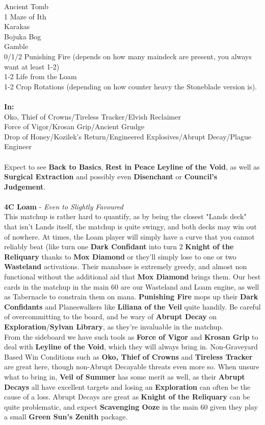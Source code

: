 \documentclass{report}
\begin{document}
Ancient Tomb\\1 Maze of Ith\\Karakas\\Bojuka Bog\\Gamble\\ 0/1/2 Punishing Fire (depends on how many maindeck are present, you always want at least 1-2)\\1-2 Life from the Loam\\1-2 Crop Rotations (depending on how counter heavy the Stoneblade version is).\\\\
\textbf{In:}\\Oko, Thief of Crowns/Tireless Tracker/Elvish Reclaimer\\Force of Vigor/Krosan Grip/Ancient Grudge\\
Drop of Honey/Kozilek's Return/Engineered Explosives/Abrupt Decay/Plague Engineer\\\\
Expect to see \textbf{Back to Basics}, \textbf{Rest in Peace} \textbf{Leyline of the Void}, as well as \textbf{Surgical Extraction} and possibly even \textbf{Disenchant} or \textbf{Council's Judgement}.\\\\
\textbf{4C Loam} - \emph{Even to Slightly Favoured}\\
This matchup is rather hard to quantify, as by being the closest "Lands deck" that isn't Lands itself, the matchup is quite swingy, and both decks may win out of nowhere. At times, the Loam player will simply have a curve that you cannot reliably beat (like turn one \textbf{Dark Confidant} into turn 2 \textbf{Knight of the Reliquary} thanks to \textbf{Mox Diamond} or they'll simply lose to one or two \textbf{Wasteland} activations. Their manabase is extremely greedy, and almost non functional without the additional aid that \textbf{Mox Diamond} brings them. Our best cards in the matchup in the main 60 are our Wasteland and Loam engine, as well as Tabernacle to constrain them on mana. \textbf{Punishing Fire} mops up their \textbf{Dark Confidants} and Planeswalkers like \textbf{Liliana of the Veil} quite handily. Be careful of overcommitting to the board, and be wary of \textbf{Abrupt Decay} on \textbf{Exploration}/\textbf{Sylvan Library}, as they're invaluable in the matchup.\\
From the sideboard we have such tools as \textbf{Force of Vigor} and \textbf{Krosan Grip} to deal with \textbf{Leyline of the Void}, which they will always bring in. Non-Graveyard Based Win Conditions such as \textbf{Oko, Thief of Crowns} and \textbf{Tireless Tracker} are great here, though non-Abrupt Decayable threats even more so. When unsure what to bring in, \textbf{Veil of Summer} has some merit as well, as their \textbf{Abrupt Decays} all have excellent targets and losing an \textbf{Exploration} can often be the cause of a loss. Abrupt Decays are great as \textbf{Knight of the Reliquary} can be quite problematic, and expect \textbf{Scavenging Ooze} in the main 60 given they play a small \textbf{Green Sun's Zenith} package.\\\\
\end{document}
